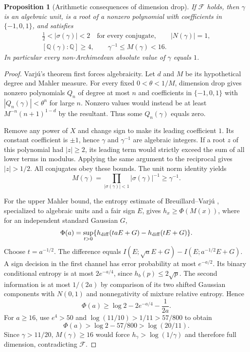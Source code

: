 \documentclass[11pt,a4paper]{article}
\newcommand{\Q}{\mathbb Q}
\newtheorem{proposition}[theorem]{Proposition}
\theoremstyle{definition}
\theoremstyle{remark}
\numberwithin{equation}{section}
\begin{document}
\begin{proposition}[Arithmetic consequences of dimension drop]\label{inf:prop:fractal-branch}
If $\mathcal F$ holds, then $\gamma$ is an algebraic unit, is a root of a nonzero polynomial with coefficients in $\{-1,0,1\}$, and satisfies
\[
\begin{gathered}
 \frac12<|\sigma(\gamma)|<2\quad\text{for every conjugate},\qquad |N(\gamma)|=1,\\
 [\Q(\gamma):\Q]\ge4,\qquad \gamma^{-1}\le M(\gamma)<16.
\end{gathered}
\]
In particular every non-Archimedean absolute value of $\gamma$ equals $1$.
\end{proposition}
\begin{proof}
Varj\'u's theorem first forces algebraicity. Let $d$ and $M$ be its hypothetical degree and Mahler measure. For every fixed $0<\theta<1/M$, dimension drop gives nonzero polynomials $Q_n$ of degree at most $n$ and coefficients in $\{-1,0,1\}$ with $|Q_n(\gamma)|<\theta^n$ for large $n$. Nonzero values would instead be at least $M^{-n}(n+1)^{1-d}$ by the resultant. Thus some $Q_n(\gamma)$ equals zero.

Remove any power of $X$ and change sign to make its leading coefficient $1$. Its constant coefficient is $\pm1$, hence $\gamma$ and $\gamma^{-1}$ are algebraic integers. If a root $z$ of this polynomial had $|z|\ge2$, its leading term would strictly exceed the sum of all lower terms in modulus. Applying the same argument to the reciprocal gives $|z|>1/2$. All conjugates obey these bounds. The unit norm identity yields
\[
 M(\gamma)=\prod_{|\sigma(\gamma)|<1}|\sigma(\gamma)|^{-1}\ge\gamma^{-1}.
\]

For the upper Mahler bound, the entropy estimate of Breuillard--Varj\'u \cite[Proposition 13]{inf:BV}, specialized to algebraic units and a fair sign $E$, gives $h_x\ge\Phi(M(x))$, where for an independent standard Gaussian $G$,
\[
 \Phi(a)=\sup_{t>0}\{h_{\rm diff}(taE+G)-h_{\rm diff}(tE+G)\}.
\]
Choose $t=a^{-1/2}$. The difference equals
$I(E;\sqrt aE+G)-I(E;a^{-1/2}E+G)$. A sign decision in the first channel has error probability at most $e^{-a/2}$. Its binary conditional entropy is at most $2e^{-a/4}$, since $h_b(p)\le2\sqrt p$. The second information is at most $1/(2a)$ by comparison of its two shifted Gaussian components with $N(0,1)$ and nonnegativity of mixture relative entropy. Hence
\[
 \Phi(a)\ge\log2-2e^{-a/4}-\frac1{2a}.
\]
For $a\ge16$, use $e^4>50$ and $\log(11/10)>1/11>57/800$ to obtain
\[
 \Phi(a)>\log2-57/800>\log(20/11).
\]
Since $\gamma>11/20$, $M(\gamma)\ge16$ would force $h_\gamma>\log(1/\gamma)$ and therefore full dimension, contradicting $\mathcal F$.


\end{proof}
\end{document}
